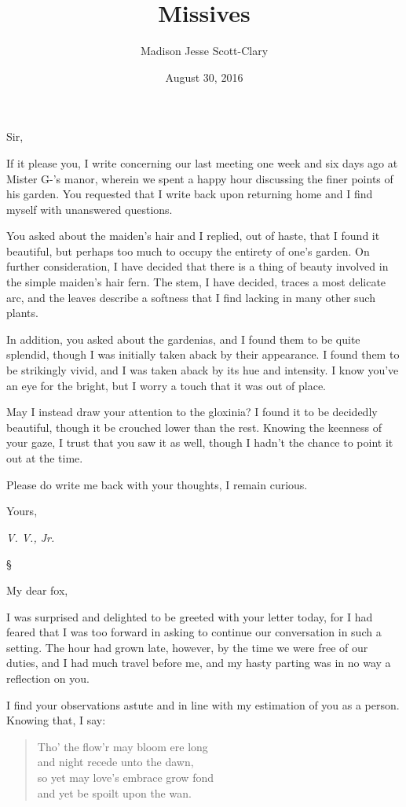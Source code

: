 \documentclass[12pt,letterpaper,oneside]{memoir}
\title{Missives}
\author{Madison Jesse Scott-Clary}
\date{August 30, 2016}
\newcommand\secdiv{
  \begin{center}
    \S
  \end{center}
}
\begin{document}
  \maketitle
  Sir,

  If it please you, I write concerning our last meeting one week and six
  days ago at Mister G-'s manor, wherein we spent a happy hour discussing
  the finer points of his garden. You requested that I write back upon
  returning home and I find myself with unanswered questions.

  You asked about the maiden's hair and I replied, out of haste, that I
  found it beautiful, but perhaps too much to occupy the entirety of one's
  garden. On further consideration, I have decided that there is a thing
  of beauty involved in the simple maiden's hair fern. The stem, I have
  decided, traces a most delicate arc, and the leaves describe a softness
  that I find lacking in many other such plants.

  In addition, you asked about the gardenias, and I found them to be quite
  splendid, though I was initially taken aback by their appearance. I
  found them to be strikingly vivid, and I was taken aback by its hue and
  intensity. I know you've an eye for the bright, but I worry a touch that
  it was out of place.

  May I instead draw your attention to the gloxinia? I found it to be
  decidedly beautiful, though it be crouched lower than the rest. Knowing
  the keenness of your gaze, I trust that you saw it as well, though I
  hadn't the chance to point it out at the time.

  Please do write me back with your thoughts, I remain curious.

  Yours,

  \emph{V. V., Jr.}

  \secdiv

  My dear fox,

  I was surprised and delighted to be greeted with your letter today, for
  I had feared that I was too forward in asking to continue our
  conversation in such a setting. The hour had grown late, however, by the
  time we were free of our duties, and I had much travel before me, and my
  hasty parting was in no way a reflection on you.

  I find your observations astute and in line with my estimation of you as
  a person. Knowing that, I say:

  \begin{quote}
  Tho' the flow'r may bloom ere long\\
  and night recede unto the dawn,\\
  so yet may love's embrace grow fond\\
  and yet be spoilt upon the wan.
  \end{quote}
\end{document}
